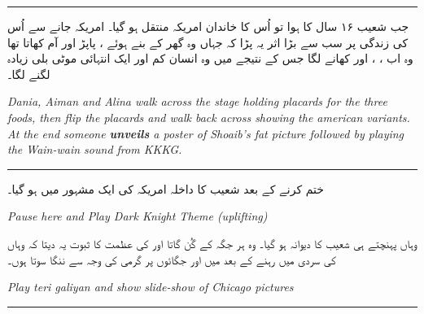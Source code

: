\documentclass{article}
\begin{document}
\rule{\textwidth}{1pt}

جب شعیب ۱۶ سال کا ہوا تو اُس کا خاندان امریکہ منتقل ہو گیا۔ امریکہ جانے سے اُس کی زندگی پر سب سے بڑا اثر یہ پڑا کہ جہاں وہ گھر کے بنے ہوئے ، پاپڑ اور آم کھاتا تھا وہ اب ، ، اور  کھانے لگا جس کے نتیجے میں وہ انسان کم اور ایک انتہائی موٹی بلی زیادہ لگنے لگا۔  

\begin{enpara}
	\itshape
	Dania, Aiman and Alina walk across the stage holding placards for the three foods, then flip the placards and walk back across showing the american variants. At the end someone \textbf{unveils} a poster of Shoaib's fat picture followed by playing the Wain-wain sound from KKKG.
\end{enpara}

\rule{\textwidth}{1pt}

 ختم کرنے کے بعد شعیب کا داخلہ امریکہ کی ایک مشہور  میں ہو گیا۔
\begin{enpara}
	\itshape
	Pause here and Play Dark Knight Theme (uplifting)
\end{enpara}

\vspace{0.5\baselineskip}
وہاں پہنچتے ہی شعیب  کا دیوانہ ہو گیا۔ وہ ہر جگہ  کے گُن گاتا اور  کی عظمت کا ثبوت یہ دیتا کہ وہاں کی سردی میں رہنے کے بعد میں اور جگائوں پر گرمی کی وجہ سے ننگا سوتا ہوں۔ \hfill {}

\begin{enpara}
	\itshape
	Play teri galiyan and show slide-show of Chicago pictures
\end{enpara}

\rule{\textwidth}{1pt}
\end{document}
